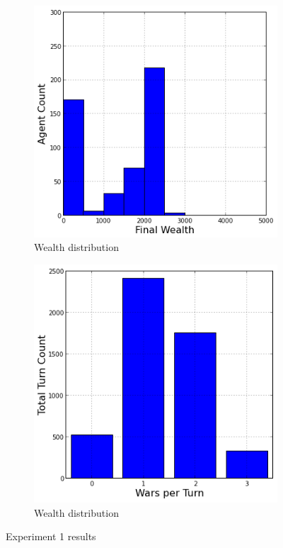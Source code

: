 \documentclass{article}
\begin{document}
\begin{figure}[h!]
	\begin{subfigure}{0.49\textwidth}
		\includegraphics[width=\textwidth]{Graphics/Exp1WealthDistribution}
		\caption{Wealth distribution}
	\end{subfigure}
	\begin{subfigure}{0.49\textwidth}
		\includegraphics[width=\textwidth]{Graphics/Exp1WarDistribution}
		\caption{Wealth distribution}
	\end{subfigure}
\caption{Experiment 1 results}
\end{figure}
\end{document}
